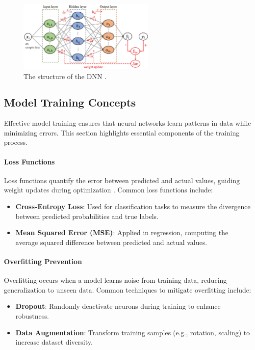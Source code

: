 \begin{figure}[H] %
    \centering
    \includegraphics[width=0.6\textwidth]{chapters/chapter1/images/Figure03.png}
    \caption{The structure of the DNN \cite{ren2023review}.}
    \label{fig:figure03}
\end{figure}



\subsection{Model Training Concepts}

Effective model training ensures that neural networks learn patterns in data while minimizing errors. This section highlights essential components of the training process.

\paragraph{Loss Functions} 
Loss functions quantify the error between predicted and actual values, guiding weight updates during optimization \parencite{alzubaidi2021review}. Common loss functions include:
\begin{itemize}
    \item \textbf{Cross-Entropy Loss}: Used for classification tasks to measure the divergence between predicted probabilities and true labels.
    \item \textbf{Mean Squared Error (MSE)}: Applied in regression, computing the average squared difference between predicted and actual values.
\end{itemize}

\paragraph{Overfitting Prevention}
Overfitting occurs when a model learns noise from training data, reducing generalization to unseen data. Common techniques to mitigate overfitting include:
\begin{itemize}
    \item \textbf{Dropout}: Randomly deactivate neurons during training to enhance robustness.
    \item \textbf{Data Augmentation}: Transform training samples (e.g., rotation, scaling) to increase dataset diversity.
\end{itemize}

